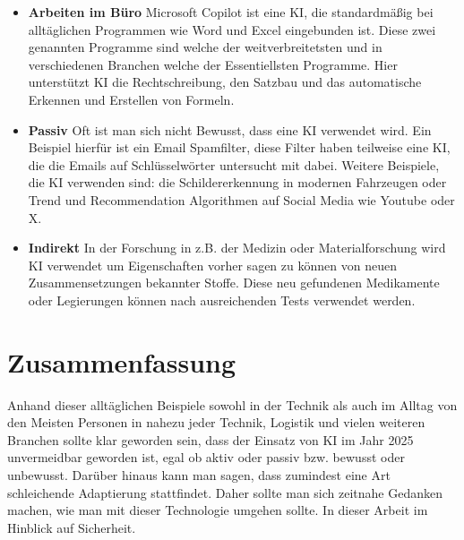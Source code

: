 \begin{itemize}
    \item \textbf{Arbeiten im Büro}
        Microsoft Copilot ist eine KI, die standardmäßig bei alltäglichen Programmen wie Word und Excel 
        eingebunden ist. Diese zwei genannten Programme sind welche der weitverbreitetsten und in 
        verschiedenen Branchen welche der Essentiellsten Programme. Hier unterstützt KI die Rechtschreibung, 
        den Satzbau und das automatische Erkennen und Erstellen von Formeln.

    \item \textbf{Passiv}
        Oft ist man sich nicht Bewusst, dass eine KI verwendet wird. Ein Beispiel hierfür ist ein Email Spamfilter, 
        diese Filter haben teilweise eine KI, die die Emails auf Schlüsselwörter untersucht mit dabei.
        Weitere Beispiele, die KI verwenden sind: die Schildererkennung in modernen Fahrzeugen oder Trend 
        und Recommendation Algorithmen auf Social Media wie Youtube oder X.

    \item \textbf{Indirekt}
        In der Forschung in z.B. der Medizin oder Materialforschung wird KI verwendet um Eigenschaften vorher 
        sagen zu können von neuen Zusammensetzungen bekannter Stoffe. Diese neu gefundenen Medikamente oder 
        Legierungen können nach ausreichenden Tests verwendet werden.

\end{itemize}

\section{Zusammenfassung}
Anhand dieser alltäglichen Beispiele sowohl in der Technik als auch im Alltag von den Meisten 
Personen in nahezu jeder Technik, Logistik und vielen weiteren Branchen sollte klar geworden sein, dass 
der Einsatz von KI im Jahr 2025 unvermeidbar geworden ist, egal ob aktiv oder passiv bzw. bewusst oder unbewusst. 
Darüber hinaus kann man sagen, dass zumindest eine Art schleichende Adaptierung stattfindet. 
Daher sollte man sich zeitnahe Gedanken machen, wie man mit dieser Technologie umgehen sollte. 
In dieser Arbeit im Hinblick auf Sicherheit.